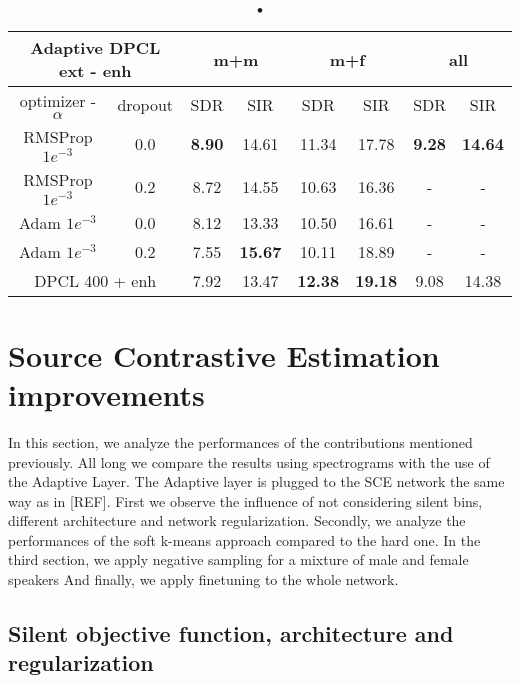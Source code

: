 \documentclass[master,final,11pt]{iscs-thesis}
\begin{document}
\begin{table}
\centering
\begin{tabular}{c|c|c|c|c|c|c|c}
\multicolumn{2}{c|}{Adaptive DPCL ext - enh} & \multicolumn{2}{c|}{m+m} & \multicolumn{2}{c|}{m+f} & \multicolumn{2}{c}{all} \\ 
\hline 
optimizer - $\alpha$ & dropout & SDR & SIR & SDR & SIR & SDR & SIR \\ 
\hline 
RMSProp $1e^{-3}$ & 0.0 & \textbf{8.90} & 14.61 & 11.34 & 17.78 & \textbf{9.28} & \textbf{14.64} \\ 
RMSProp $1e^{-3}$ & 0.2 & 8.72 & 14.55 & 10.63 & 16.36 & - & - \\ 
Adam $1e^{-3}$ & 0.0 & 8.12 & 13.33 & 10.50 & 16.61 & - & - \\ 
Adam $1e^{-3}$ & 0.2 & 7.55 & \textbf{15.67} & 10.11 & 18.89 & - & - \\ 
\hline 
\hline 
\multicolumn{2}{c|}{DPCL 400 + enh}
 & 7.92 & 13.47 & \textbf{12.38} & \textbf{19.18} & 9.08 & 14.38 \\ 
\end{tabular}
\captionsetup{justification=centering}
\caption{•}
\label{table:AdaptDPCLext}
\end{table}

\section{Source Contrastive Estimation improvements}

In this section, we analyze the performances of the contributions mentioned previously. All long we compare the results using spectrograms with the use of the Adaptive Layer. The Adaptive layer is plugged to the SCE network the same way as in [REF].
First we observe the influence of not considering silent bins, different architecture and network regularization. Secondly, we analyze the performances of the soft k-means approach compared to the hard one. In the third section, we apply negative sampling for a mixture of male and female speakers
And finally, we apply finetuning to the whole network.

\subsection{Silent objective function, architecture and regularization}
\label{silentloss}
\end{document}
